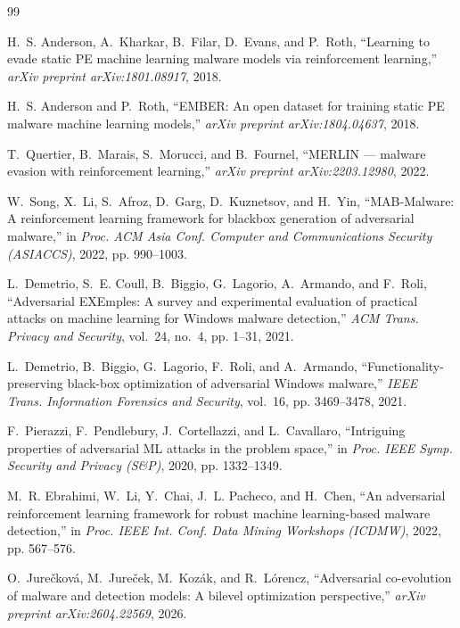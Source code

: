\documentclass[conference]{IEEEtran}
\begin{document}
\begin{thebibliography}{99}
\small

H.~S. Anderson, A.~Kharkar, B.~Filar, D.~Evans, and P.~Roth, ``Learning to
evade static PE machine learning malware models via reinforcement learning,''
\emph{arXiv preprint arXiv:1801.08917}, 2018.

H.~S. Anderson and P.~Roth, ``EMBER: An open dataset for training static PE
malware machine learning models,'' \emph{arXiv preprint arXiv:1804.04637},
2018.

T.~Quertier, B.~Marais, S.~Morucci, and B.~Fournel, ``MERLIN --- malware
evasion with reinforcement learning,'' \emph{arXiv preprint arXiv:2203.12980},
2022.

W.~Song, X.~Li, S.~Afroz, D.~Garg, D.~Kuznetsov, and H.~Yin, ``MAB-Malware: A
reinforcement learning framework for blackbox generation of adversarial
malware,'' in \emph{Proc. ACM Asia Conf. Computer and Communications Security
(ASIACCS)}, 2022, pp. 990--1003.

L.~Demetrio, S.~E. Coull, B.~Biggio, G.~Lagorio, A.~Armando, and F.~Roli,
``Adversarial EXEmples: A survey and experimental evaluation of practical
attacks on machine learning for Windows malware detection,'' \emph{ACM Trans.
Privacy and Security}, vol.~24, no.~4, pp. 1--31, 2021.

L.~Demetrio, B.~Biggio, G.~Lagorio, F.~Roli, and A.~Armando,
``Functionality-preserving black-box optimization of adversarial Windows
malware,'' \emph{IEEE Trans. Information Forensics and Security}, vol.~16, pp.
3469--3478, 2021.

F.~Pierazzi, F.~Pendlebury, J.~Cortellazzi, and L.~Cavallaro, ``Intriguing
properties of adversarial ML attacks in the problem space,'' in \emph{Proc.
IEEE Symp. Security and Privacy (S\&P)}, 2020, pp. 1332--1349.

M.~R. Ebrahimi, W.~Li, Y.~Chai, J.~L. Pacheco, and H.~Chen, ``An adversarial
reinforcement learning framework for robust machine learning-based malware
detection,'' in \emph{Proc. IEEE Int. Conf. Data Mining Workshops (ICDMW)},
2022, pp. 567--576.

O.~Jure\v{c}kov\'{a}, M.~Jure\v{c}ek, M.~Koz\'{a}k, and R.~L\'{o}rencz,
``Adversarial co-evolution of malware and detection models: A bilevel
optimization perspective,'' \emph{arXiv preprint arXiv:2604.22569}, 2026.


\end{thebibliography}
\end{document}
